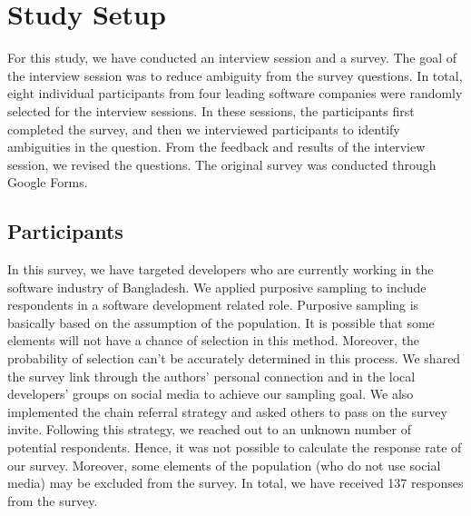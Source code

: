 \section{Study Setup}
\label{study_setup}

For this study, we have conducted an interview session and a survey. The goal of the interview session was to reduce ambiguity from the survey questions. In total, eight individual participants from four leading software companies were randomly selected for the interview sessions. In these sessions, the participants first completed the survey, and then we interviewed participants to identify ambiguities in the question. From the feedback and results of the interview session, we revised the questions. The original survey was conducted through Google Forms.

\subsection{Participants}
\label{survey_participants}
In this survey, we have targeted developers who are currently working in the software industry of Bangladesh. We applied purposive sampling\cite{Vogt2005} to include respondents in a software development related role. Purposive sampling is basically based on the assumption of the population. It is possible that some elements will not have a chance of selection in this method. Moreover, the probability of selection can't be accurately determined in this process. We shared the survey link through the authors' personal connection and in the local developers' groups on social media to achieve our sampling goal. We also implemented the chain referral strategy\cite{creswell2013} and asked others to pass on the survey invite. Following this strategy, we reached out to an unknown number of potential respondents. Hence, it was not possible to calculate the response rate of our survey. Moreover, some elements of the population (who do not use social media) may be excluded from the survey. In total, we have received 137 responses from the survey. 

